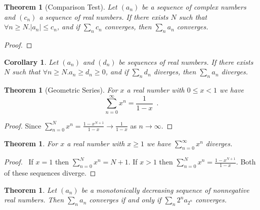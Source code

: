 \documentclass{book}
\let\qed\relax
\newtheorem{cor}{Corollary}[prop]
\newtheorem{thm}[prop]{Theorem}
\theoremstyle{definition}
\begin{document}
\begin{thm}[Comparison Test]
Let $(a_n)$ be a sequence of complex numbers and $(c_n)$ a sequence of real numbers. If there exists $N$ such that $\forall n \geq N. |a_n| \leq c_n$, and if $\sum_n c_n$ converges, then $\sum_n a_n$ converges.
\end{thm}

\begin{proof}
\pf
{}
\qed
\end{proof}

\begin{cor}
Let $(a_n)$ and $(d_n)$ be sequences of real numbers. If there exists $N$ such that $\forall n \geq N. a_n \geq d_n \geq 0$, and if $\sum_n d_n$ diverges, then $\sum_n a_n$ diverges.
\end{cor}

\begin{thm}[Geometric Series]
For $x$ a real number with $0 \leq x < 1$ we have
\[ \sum_{n=0}^\infty x^n = \frac{1}{1-x} \enspace . \]
\end{thm}

\begin{proof}
\pf
Since $\sum_{n=0}^N x^n = \frac{1 - x^{N+1}}{1-x} \rightarrow \frac{1}{1-x}$ as $n \rightarrow \infty$. \qed
\end{proof}

\begin{thm}
For $x$ a real number with $x \geq 1$ we have $\sum_{n=0}^\infty x^n$ diverges.
\end{thm}

\begin{proof}
\pf\ If $x = 1$ then $\sum_{n=0}^N x^n = N + 1$. If $x > 1$ then $\sum_{n=0}^N x^n = \frac{1 - x^{N+1}}{1-x}$. Both of these sequences diverge. \qed
\end{proof}

\begin{thm}
Let $(a_n)$ be a monotonically decreasing sequence of nonnegative real numbers. Then $\sum_n a_n$ converges if and only if $\sum_n 2^n a_{2^n}$ converges.
\end{thm}
\end{document}
